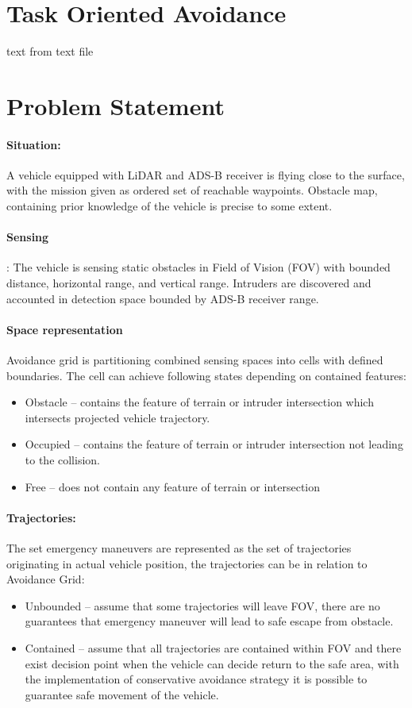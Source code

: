 \section{Task Oriented Avoidance}\label{s:taskOrientedAvoidance}
    \noindent text from text file

\section{Problem Statement}
    \paragraph{Situation:} A vehicle equipped with LiDAR and ADS-B receiver is flying close to the surface, with the mission given as ordered set of reachable waypoints. Obstacle map, containing prior knowledge of the vehicle is precise to some extent. 

    \paragraph{Sensing}: The vehicle is sensing static obstacles in Field of Vision (FOV) with bounded distance, horizontal range, and vertical range. Intruders are discovered and accounted in detection space bounded by ADS-B receiver range. 

    \paragraph{Space representation}
        Avoidance grid is partitioning combined sensing spaces into cells with defined boundaries. The cell can achieve following states depending on contained features:
        \begin{itemize}
            \item{Obstacle} – contains the feature of terrain or intruder intersection which intersects projected vehicle trajectory.
            \item{Occupied} – contains the feature of terrain or intruder intersection not leading to the collision.
            \item{Free} – does not contain any feature of terrain or intersection
        \end{itemize}
    \paragraph{Trajectories:}
        The set emergency maneuvers are represented as the set of trajectories originating in actual vehicle position, the trajectories can be in relation to Avoidance Grid:
        \begin{itemize}
            \item Unbounded – assume that some trajectories will leave FOV, there are no guarantees that emergency maneuver will lead to safe escape from obstacle. 
            \item Contained – assume that all trajectories are contained within FOV and there exist decision point when the vehicle can decide return to the safe area, with the implementation of conservative avoidance strategy it is possible to guarantee safe movement of the vehicle. 
        \end{itemize}

